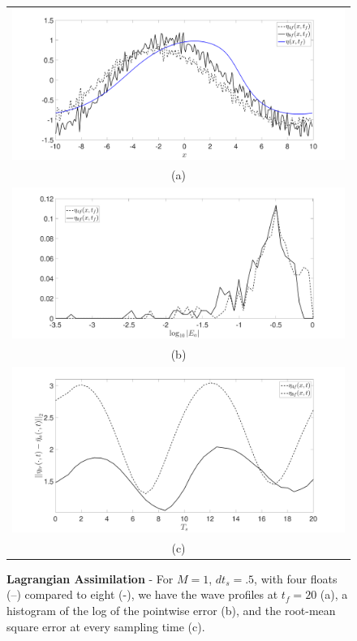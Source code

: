 \begin{figure}
	\centering
	\begin{tabular}{c}
		\includegraphics[width=.95\textwidth]{Images/wave_tf_20_sig_pt1_4_vs8floats_Mval_1} \\
		(a)\\
		\includegraphics[width=.95\textwidth]{Images/histogram_tf_20_sig_pt1_4_vs_8floats_Mval_1}\\
		(b)\\
		\includegraphics[width=.95\textwidth]{Images/rmserr_tf_20_sig_pt1_4_vs8floats_Mval_1}\\
		(c)
	\end{tabular}
	\caption{{\bf Lagrangian Assimilation} - For $M=1$, $dt_{s}=.5$, with four floats (--) compared to eight (-), we have the wave profiles at $t_{f}=20$ (a), a histogram of the log of the pointwise error (b), and the root-mean square error at every sampling time (c).} 
	\label{fig:Mval_1_lagran}
\end{figure}


